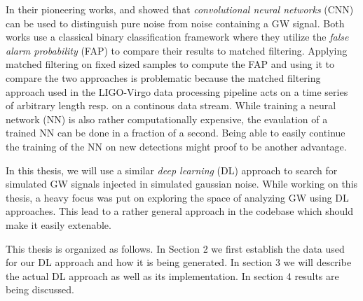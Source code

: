 In their pioneering works, \citeauthor{PhysRevD.97.044039} \cite{PhysRevD.97.044039}
and \citeauthor{PhysRevLett.120.141103} \cite{PhysRevLett.120.141103} showed
that \textit{convolutional neural networks} (CNN) can be used to distinguish 
pure noise from noise containing a GW signal. Both works use a classical binary
classification framework where they utilize the \textit{false alarm probability}
(FAP) to compare their results to matched filtering. Applying matched filtering
on fixed sized samples to compute the FAP and using it to compare the two
approaches is problematic because the matched filtering approach used in the 
LIGO-Virgo data processing pipeline acts on a time series of arbitrary length
resp. on a continous data stream. \cite{PhysRevD.100.063015}
While training a neural network (NN) is also rather computationally expensive, the
evaulation of a trained NN can be done in a fraction of a second. Being able
to easily continue the training of the NN on new detections might proof to
be another advantage.

In this thesis, we will use a similar \textit{deep learning} (DL) approach to search
for simulated GW signals injected in simulated gaussian noise. While working on
this thesis, a heavy focus was put on exploring the space of analyzing GW using
DL approaches. This lead to a rather general approach in the codebase which
should make it easily extenable.

This thesis is organized as follows. In Section 2 we first establish the data
used for our DL approach and how it is being generated. In section 3 
we will describe the actual DL approach as well as its implementation.
In section 4 results are being discussed.
